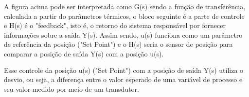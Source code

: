 \documentclass[a4paper,12pt,twoside]{article}
\begin{document}
 A figura acima pode ser interpretada como G(s) sendo a função de transferência, calculada a partir do parâmetros térmicos, o bloco seguinte é a parte de controle e H(s) é o "feedback", isto é, o retorno do sistema responsável por fornecer informações sobre a saída Y(s). Assim sendo, u(s) funciona como um parâmetro de referência da posição ("Set Point") e o H(s) seria o sensor de posição para comparar a posição de saída Y(s) com a posição u(s).

 Esse controle da posição u(s) ("Set Point") com a posição de saída Y(s) utiliza o desvio, ou seja, a diferença entre o valor esperado de uma variável de processo e seu valor medido por meio de um transdutor.
\end{document}
